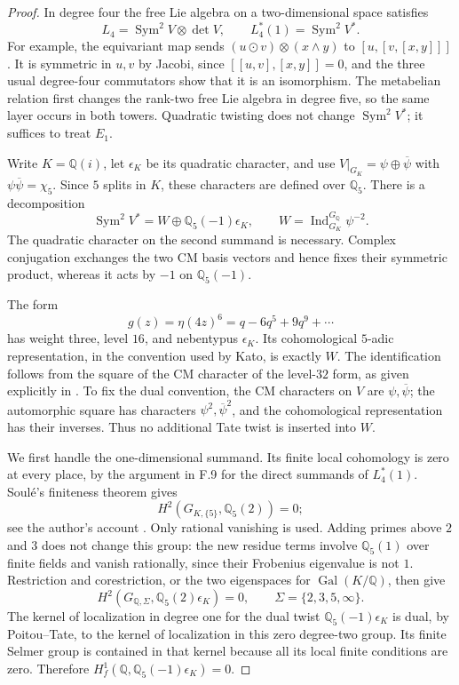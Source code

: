 \begin{proof}
In degree four the free Lie algebra on a two-dimensional space satisfies
\[
 L_4=\operatorname{Sym}^2V\otimes\det V,
 \qquad L_4^*(1)=\operatorname{Sym}^2V^*.
\]
For example, the equivariant map sends
$(u\mathbin{\odot}v)\otimes(x\wedge y)$ to
$[u,[v,[x,y]]]$. It is symmetric in $u,v$ by Jacobi, since
$[[u,v],[x,y]]=0$, and the three usual degree-four commutators
show that it is an isomorphism. The metabelian relation first
changes the rank-two free Lie algebra in degree five, so the same
layer occurs in both towers. Quadratic twisting does not change
$\operatorname{Sym}^2V^*$; it suffices to treat $E_1$.

Write $K=\mathbb Q(i)$, let $\epsilon_K$ be its quadratic character,
and use $V|_{G_K}=\psi\oplus\overline\psi$ with
$\psi\overline\psi=\chi_5$. Since $5$ splits in $K$, these
characters are defined over $\mathbb Q_5$. There is a decomposition
\[
 \operatorname{Sym}^2V^*
   =W\oplus\mathbb Q_5(-1)\epsilon_K,
 \qquad W=\operatorname{Ind}_{G_K}^{G_{\mathbb Q}}\psi^{-2}.
\]
The quadratic character on the second summand is necessary.
Complex conjugation exchanges the two CM basis vectors and hence
fixes their symmetric product, whereas it acts by $-1$ on
$\mathbb Q_5(-1)$.

The form
\[
 g(z)=\eta(4z)^6=q-6q^5+9q^9+\cdots
\]
has weight three, level $16$, and nebentypus $\epsilon_K$.
Its cohomological $5$-adic representation, in the convention used
by Kato, is exactly $W$.
The identification follows from the square of the CM character
of the level-$32$ form, as given explicitly in
\citet[Theorem~1.1 and the symmetric-square factorization on p.~3]
{FA_LiLongTu2018}. To fix the dual convention, the CM characters
on $V$ are $\psi,\overline\psi$; the automorphic square has
characters $\psi^2,\overline\psi^2$, and the cohomological
representation has their inverses. Thus no additional Tate twist
is inserted into $W$.

We first handle the one-dimensional summand. Its finite local
cohomology is zero at every place, by the argument in F.9 for
the direct summands of $L_4^*(1)$. Soul\'e's finiteness theorem
gives
\[
 H^2(G_{K,\{5\}},\mathbb Q_5(2))=0;
\]
see the author's account
\citet[Corollary~27, with the preceding surjectivity explanation]
{FA_Soule2008}. Only rational vanishing is used.
Adding primes above $2$ and $3$ does not change this group: the
new residue terms involve $\mathbb Q_5(1)$ over finite fields
and vanish rationally, since their Frobenius eigenvalue is not
$1$. Restriction and corestriction, or the two eigenspaces for
$\operatorname{Gal}(K/\mathbb Q)$, then give
\[
 H^2(G_{\mathbb Q,\Sigma},\mathbb Q_5(2)\epsilon_K)=0,
 \qquad \Sigma=\{2,3,5,\infty\}.
\]
The kernel of localization in degree one for the dual twist
$\mathbb Q_5(-1)\epsilon_K$ is dual, by Poitou--Tate, to the
kernel of localization in this zero degree-two group. Its finite
Selmer group is contained in that kernel because all its local
finite conditions are zero. Therefore
$H_f^1(\mathbb Q,\mathbb Q_5(-1)\epsilon_K)=0$.


\end{proof}
